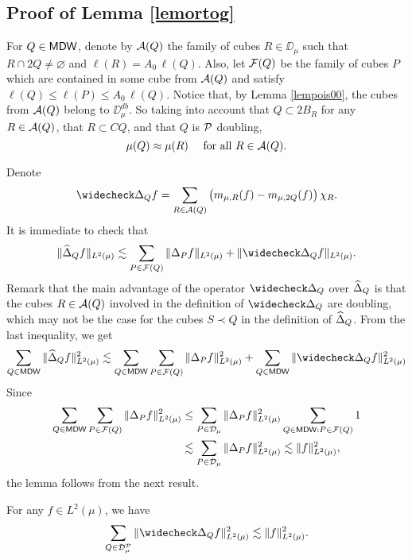 
\subsection{Proof of Lemma \ref{lemortog}}\label{sec10.3}
For $Q\in {\mathsf{MDW}}$, denote by ${\mathcal A}(Q)$ the family of cubes $R\in\DD_\mu$ such that $R\cap2Q\neq \varnothing$
and $\ell(R)=A_0\,\ell(Q)$. 
Also, let ${\mathcal F}(Q)$ be the family of cubes $P$ which are contained in some cube from ${\mathcal A}(Q)$ and satisfy
$\ell(Q)\leq \ell(P)\leq A_0\,\ell(Q)$. Notice that, by Lemma \ref{lempois00}, the cubes from ${\mathcal A}(Q)$ belong to $\DD_\mu^{db}$. So taking into account that $Q\subset 2B_R$ for any $R\in{\mathcal A}(Q)$, that $R\subset CQ$, and that
$Q$ is ${\mathcal P}$ doubling,
\begin{equation}\label{eqcompar39}
\mu(Q)\approx \mu(R)\quad\mbox{ for all $R\in{\mathcal A}(Q)$.}
\end{equation}

Denote
$$\widecheck \Delta_Q f = \sum_{R\in\cA(Q)} \big(m_{\mu,R}(f)- m_{\mu,2Q}(f)\big)\,\chi_{R}.$$
It is immediate to check that
$$\|\wh\Delta_Q f\|_{L^2(\mu)}\lesssim \sum_{P\in\cF(Q)}\|\Delta_Pf\|_{L^2(\mu)} + \|\widecheck\Delta_Q f\|_{L^2(\mu)}.$$
Remark that the main advantage of the operator $\wk\Delta_Q$ over ${\widehat{\Delta}}_Q$ is that the cubes
$R\in{\mathcal A}(Q)$ involved in the definition of $\wk\Delta_Q$ are doubling, which may not be the case for the cubes $S\prec Q$ in the definition of ${\widehat{\Delta}}_Q$.
From the last inequality, we get
$$\sum_{Q\in\MDW}\|\wh\Delta_Q f\|_{L^2(\mu)}^2 \lesssim \sum_{Q\in\MDW}\sum_{P\in\cF(Q)}\|\Delta_Pf\|_{L^2(\mu)}^2
+ \sum_{Q\in\MDW}\|\widecheck\Delta_Q f\|_{L^2(\mu)}^2 
$$
Since
\begin{align*}
\sum_{Q\in{\mathsf{MDW}}}\sum_{P\in{\mathcal F}(Q)}\|\Delta_Pf\|_{L^2(\mu)}^2 &\leq \sum_{P\in{\mathcal D}_\mu}\|\Delta_Pf\|_{L^2(\mu)}^2
\sum_{Q\in{\mathsf{MDW}}: P\in{\mathcal F}(Q)}1\\
&\lesssim \sum_{P\in{\mathcal D}_\mu}\|\Delta_Pf\|_{L^2(\mu)}^2\lesssim\|f\|_{L^2(\mu)}^2,
\end{align*}
the lemma follows from the next result.


\begin{lemma}\label{lemortog2}
For any $f\in L^2(\mu)$, we have
$$\sum_{Q\in \DD_\mu^\PP} \|\wk \Delta_Q f\|_{L^2(\mu)}^2\lesssim \|f\|_{L^2(\mu)}^2.$$
\end{lemma}


